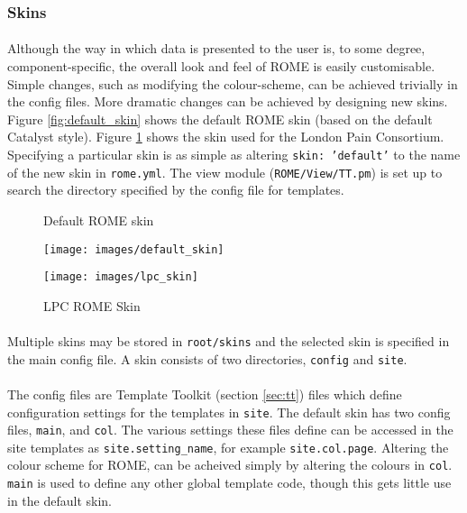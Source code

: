 \subsubsection{Skins}

\paragraph{}
Although the way in which data is presented to the user is, to some degree, component-specific, the overall look and feel of ROME is easily customisable. Simple changes, such as modifying the colour-scheme, can be achieved trivially in the config files. More dramatic changes can be achieved by designing new skins. Figure \ref{fig:default_skin} shows the default ROME skin (based on the default Catalyst style). Figure \ref{fig:lpc_skin} shows the skin used for the London Pain Consortium. Specifying a particular skin is as simple as altering \texttt{skin: 'default'} to the name of the new skin in \texttt{rome.yml}.  The view module (\texttt{ROME/View/TT.pm}) is set up to search the directory specified by the config file for templates.


\clearpage
\begin{figure}
\centering
\caption{Default ROME skin}\label{fig:default_skin}
\texttt{[image: images/default\_skin]}
\centering
\caption{LPC ROME Skin}\label{fig:lpc_skin}
\texttt{[image: images/lpc\_skin]}
\end{figure}




\paragraph{}
Multiple skins may be stored in \texttt{root/skins} and the selected skin is specified in the main config file. A skin consists of two directories, \texttt{config} and \texttt{site}.

\paragraph{}
The config files are Template Toolkit (section \ref{sec:tt}) files which define configuration settings for the templates in \texttt{site}. The default skin has two config files, \texttt{main}, and \texttt{col}. The various settings these files define can be accessed in the site templates as \texttt{site.setting\_name}, for example \texttt{site.col.page}.  Altering the colour scheme for ROME, can be acheived simply by altering the colours in \texttt{col}. \texttt{main} is used to define any other global template code, though this gets little use in the default skin. 


